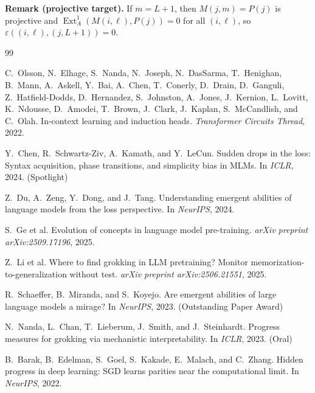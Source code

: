 \documentclass{article}
\newcommand{\Ext}{\operatorname{Ext}}
\theoremstyle{definition}
\begin{document}
\noindent
\textbf{Remark (projective target).}
If $m=L+1$, then $M(j,m)=P(j)$ is projective and $\Ext^1_A(M(i,\ell),P(j))=0$ for all $(i,\ell)$, so
$\varepsilon((i,\ell),(j,L+1))=0$.
\begin{thebibliography}{99}

C.~Olsson, N.~Elhage, S.~Nanda, N.~Joseph, N.~DasSarma, T.~Henighan, B.~Mann, A.~Askell, Y.~Bai, A.~Chen, T.~Conerly, D.~Drain, D.~Ganguli, Z.~Hatfield-Dodds, D.~Hernandez, S.~Johnston, A.~Jones, J.~Kernion, L.~Lovitt, K.~Ndousse, D.~Amodei, T.~Brown, J.~Clark, J.~Kaplan, S.~McCandlish, and C.~Olah.
\newblock In-context learning and induction heads.
\newblock \emph{Transformer Circuits Thread}, 2022.

Y.~Chen, R.~Schwartz-Ziv, A.~Kamath, and Y.~LeCun.
\newblock Sudden drops in the loss: Syntax acquisition, phase transitions, and simplicity bias in {MLMs}.
\newblock In \emph{ICLR}, 2024. (Spotlight)

Z.~Du, A.~Zeng, Y.~Dong, and J.~Tang.
\newblock Understanding emergent abilities of language models from the loss perspective.
\newblock In \emph{NeurIPS}, 2024.

S.~Ge et al.
\newblock Evolution of concepts in language model pre-training.
\newblock \emph{arXiv preprint arXiv:2509.17196}, 2025.

Z.~Li et al.
\newblock Where to find grokking in {LLM} pretraining? {Monitor} memorization-to-generalization without test.
\newblock \emph{arXiv preprint arXiv:2506.21551}, 2025.

R.~Schaeffer, B.~Miranda, and S.~Koyejo.
\newblock Are emergent abilities of large language models a mirage?
\newblock In \emph{NeurIPS}, 2023. (Outstanding Paper Award)

N.~Nanda, L.~Chan, T.~Lieberum, J.~Smith, and J.~Steinhardt.
\newblock Progress measures for grokking via mechanistic interpretability.
\newblock In \emph{ICLR}, 2023. (Oral)

B.~Barak, B.~Edelman, S.~Goel, S.~Kakade, E.~Malach, and C.~Zhang.
\newblock Hidden progress in deep learning: {SGD} learns parities near the computational limit.
\newblock In \emph{NeurIPS}, 2022.


\end{thebibliography}
\end{document}
